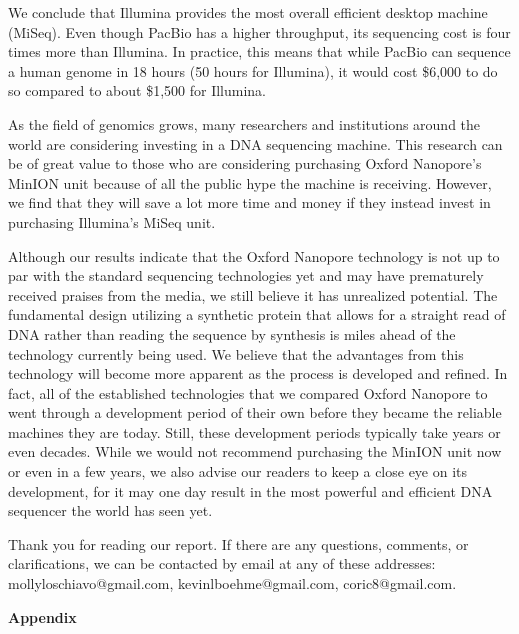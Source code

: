 \documentclass[12pt,letterpaper]{report}
\begin{document}
We conclude that Illumina provides the most overall efficient desktop machine (MiSeq).
Even though PacBio has a higher throughput, its sequencing cost is four times more than Illumina. In practice, this means that while PacBio can sequence a human genome in 18 hours (50 hours for Illumina), it would cost \$6,000 to do so compared to about \$1,500 for Illumina.

As the field of genomics grows, many researchers and institutions around the world are considering investing in a DNA sequencing machine. This research can be of great value to those who are considering purchasing Oxford Nanopore's MinION unit because of all the public hype the machine is receiving. However, we find that they will save a lot more time and money if they instead invest in purchasing Illumina's MiSeq unit.

Although our results indicate that the Oxford Nanopore technology is not up to par with the standard sequencing technologies yet and may have prematurely received praises from the media, we still believe it has unrealized potential. The fundamental design utilizing a synthetic protein that allows for a straight read of DNA rather than reading the sequence by synthesis is miles ahead of the technology currently being used. We believe that the advantages from this technology will become more apparent as the process is developed and refined. In fact, all of the established technologies that we compared Oxford Nanopore to went through a development period of their own before they became the reliable machines they are today. Still, these development periods typically take years or even decades. While we would not recommend purchasing the MinION unit now or even in a few years, we also advise our readers to keep a close eye on its development, for it may one day result in the most powerful and efficient DNA sequencer the world has seen yet.

Thank you for reading our report. If there are any questions, comments, or clarifications, we can be contacted by email at any of these addresses: mollyloschiavo@gmail.com, kevinlboehme@gmail.com, coric8@gmail.com.



\clearpage

\begin{center}
\vspace*{\fill}
\Huge\textbf{Appendix}
\vspace*{\fill}
\end{center}
\clearpage
\end{document}
